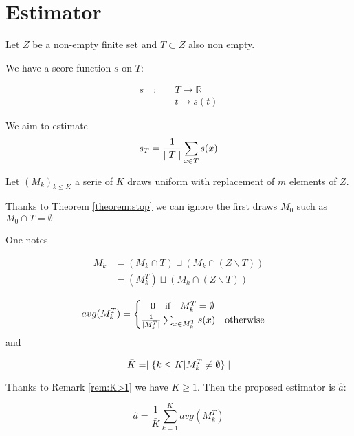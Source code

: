 \section{Estimator}



Let $Z$ be a non-empty finite set and $T \subset Z$ also non empty.

We have a score function $s$ on $T$:

\begin{equation*}
\begin{split}
    s \quad : \quad &T \longrightarrow \mathbb{R}\\
    &t                 \longrightarrow s(t)
\end{split}
\end{equation*}



We aim to estimate 
\begin{equation*}
    s_T = \frac{1}{\mid T \mid} \sum_{x \in T} s(x)
\end{equation*}

Let $(M_k)_{k \leq K}$ a serie of $K$ draws uniform with replacement of $m$ elements of $Z$.

\begin{remark}\label{rem:K>1}
    Thanks to Theorem \ref{theorem:stop} we can ignore the first draws $M_{0}$ such as $M_{0} \cap T = \emptyset$
\end{remark}

One notes


\begin{align*}
    M_k &= (M_k \cap T ) \sqcup (M_k \cap (Z \backslash T)) \\
        &= (M_k^T ) \sqcup (M_k \cap (Z \backslash T))
\end{align*}

\[
   avg(M_k^T) = 
\begin{cases}
     \quad 0 \quad \text{if} \quad M_k^T  = \emptyset\\
    \frac{1}{\mid M_k^T \mid} \sum_{x \in M_k^T}s(x) \quad \text{otherwise}
\end{cases}
\]
and

\begin{equation*}
    \bar{K} = \mid  \{ k \leq K | M_k^T \neq \emptyset \} \mid
\end{equation*}

Thanks to Remark \ref{rem:K>1} we have $\bar{K} \geq 1$. Then the proposed estimator is $\hat{a}$:

\begin{equation*}
    \hat{a} = \frac{1}{\bar{K}} \sum_{k = 1}^{K}avg(M_k^T)
\end{equation*}



